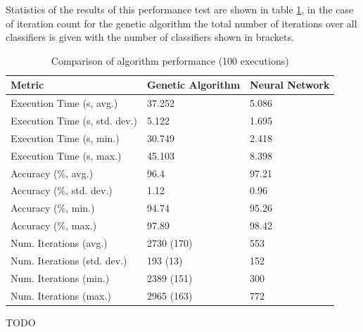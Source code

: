 \documentclass[a4paper]{article}
\begin{document}
Statistics of the results of this performance test are shown in table
\ref{tab:comparison_avg}, in the case of iteration count for the genetic
algorithm the total number of iterations over all classifiers is given with the
number of classifiers shown in brackets.

\begin{table}[h!]
  \centering
  \begin{tabular}{@{}lll@{}}
    \toprule
    Metric                        & Genetic Algorithm & Neural Network \\
    \midrule
    Execution Time (s, avg.)      & 37.252            & 5.086          \\
    Execution Time (s, std. dev.) & 5.122             & 1.695          \\
    Execution Time (s, min.)      & 30.749            & 2.418          \\
    Execution Time (s, max.)      & 45.103            & 8.398          \\
    Accuracy (\%, avg.)           & 96.4              & 97.21          \\
    Accuracy (\%, std. dev.)      & 1.12              & 0.96           \\
    Accuracy (\%, min.)           & 94.74             & 95.26          \\
    Accuracy (\%, max.)           & 97.89             & 98.42          \\
    Num. Iterations (avg.)        & 2730 (170)        & 553            \\
    Num. Iterations (std. dev.)   & 193 (13)          & 152            \\
    Num. Iterations (min.)        & 2389 (151)        & 300            \\
    Num. Iterations (max.)        & 2965 (163)        & 772            \\
    \bottomrule
  \end{tabular}
  \caption{Comparison of algorithm performance (100 executions)}
  \label{tab:comparison_avg}
\end{table}

TODO

\printbibliography
\end{document}
